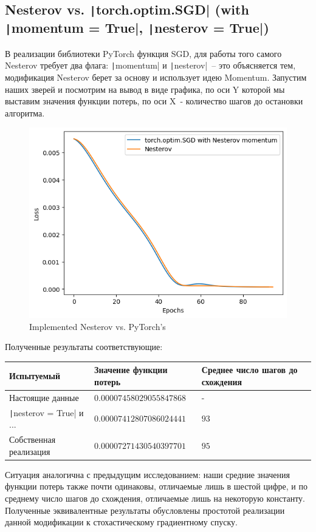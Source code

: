 \documentclass[12pt, a4paper, oneside, final]{article}
\begin{document}
	\subsection*{Nesterov vs. \texttt|torch.optim.SGD| (with \texttt|momentum = True|, \texttt|nesterov = True|)}
	В реализации библиотеки PyTorch функция SGD, для работы того самого Nesterov требует два флага: \texttt|momentum| и \texttt|nesterov|~-- это объясняется тем, модификация Nesterov берет за основу и использует идею Momentum.
	Запустим наших зверей и посмотрим на вывод в виде графика, по оси Y которой мы выставим значения функции потерь, по оси X~- количество шагов до остановки алгоритма.
	\begin{figure}[H]
		\centering
		\includegraphics[scale = 1]{Image/T1_NESTEROV_vs_torch_optim_SGD_NESTEROV.png}
		\caption*{Implemented Nesterov vs. PyTorch's}
	\end{figure}
	Полученные результаты соответствующие:
	\begin{table}[H]
		\centering
		\begin{tabular}{l|l|l}
			Испытуемый & Значение функции потерь & Среднее число шагов до схождения \\ \hline
			Настоящие данные & $0.00007458029055847868$ & - \\
			\texttt|nesterov = True| и ... & $0.00007412807086024441$ & $93$ \\
			Собственная реализация & $0.00007271430540397701$ & $95$
		\end{tabular}
	\end{table}
	Ситуация аналогична с предыдущим исследованием: наши средние значения функции потерь также почти одинаковы, отличаемые лишь в шестой цифре, и по среднему число шагов до схождения, отличаемые лишь на некоторую константу.
	Полученные эквивалентные результаты обусловлены простотой реализации данной модификации к стохастическому градиентному спуску.
\end{document}

